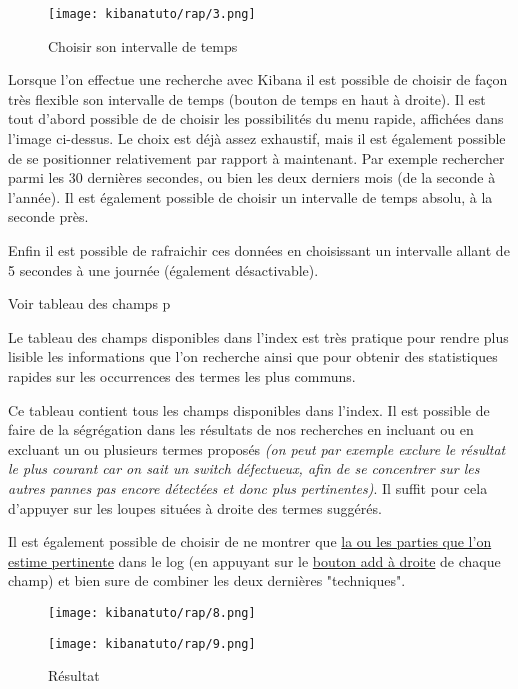 \begin{figure}[H]
\center
\texttt{[image: kibanatuto/rap/3.png]}
\label{fig:kibanatuto3}
\caption{Choisir son intervalle de temps}
\end{figure}
Lorsque l'on effectue une recherche avec Kibana il est possible de choisir de façon
très flexible son intervalle de temps (bouton de temps en haut à droite).
Il est tout d'abord possible de de choisir les possibilités du menu rapide, affichées
dans l'image ci-dessus. Le choix est déjà assez exhaustif, mais il est également 
possible de se positionner relativement par rapport à maintenant. Par exemple rechercher 
parmi les 30 dernières secondes, ou bien les deux derniers mois (de la seconde à 
l'année). Il est également possible de choisir un intervalle de temps absolu, à 
la seconde près.

Enfin il est possible de rafraichir ces données en choisissant un intervalle allant
de 5 secondes à une journée (également désactivable).

Voir tableau des champs p\pageref{fig:kibanatuto4}

Le tableau des champs disponibles dans l'index est très pratique pour rendre plus 
lisible les informations que l'on recherche ainsi que pour obtenir des statistiques 
rapides sur les occurrences des termes les plus communs.

Ce tableau contient tous les champs disponibles dans l'index. Il est possible de
faire de la ségrégation dans les résultats de nos recherches en incluant ou en   
excluant un ou plusieurs termes proposés {\footnotesize\textit{(on peut par exemple exclure le résultat 
le plus courant car on sait un switch défectueux, afin de se concentrer sur les autres
pannes pas encore détectées et donc plus pertinentes)}}. Il suffit pour cela d'appuyer
sur les loupes situées à droite des termes suggérés.


Il est également possible de choisir de ne montrer que \hyperref[fig:kibanatuto6]{la ou les parties que l'on 
estime pertinente} dans le log (en appuyant sur le \hyperref[fig:kibanatuto5]{bouton 
add à droite} de chaque champ) et bien sure de combiner les deux dernières "techniques".
\begin{figure}[H]
\begin{flushright}
\texttt{[image: kibanatuto/rap/8.png]}
\label{fig:kibanatuto5}
\end{flushright}%
\end{figure}

\begin{figure}[H]
\center
\texttt{[image: kibanatuto/rap/9.png]}
\label{fig:kibanatuto6}
\caption{Résultat}
\end{figure}

